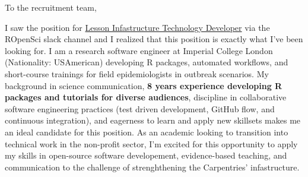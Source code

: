 




\vspace{1ex}
To the recruitment team,

\vspace{1ex}


I saw the position for
\href{https://static.carpentries.org/lesson-infrastructure-technology-developer/}{Lesson
Infastructure Technology Developer} via the ROpenSci slack channel and I
realized that this position is exactly what I've been looking for. I am a
research software engineer at Imperial College London (Nationality: USAmerican)
developing R packages, automated workflows, and short-course trainings for
field epidemiologists in outbreak scenarios. 
My background in science communication, \textbf{8 years experience developing R
packages and tutorials for diverse audiences}, discipline in collaborative
software engineering practices (test driven development, GitHub flow, and
continuous integration), and eagerness to learn and apply new skillsets makes
me an ideal candidate for this position. As an academic looking to transition into
technical work in the non-profit sector, I'm excited for this opportunity to
apply my skills in open-source software developement, evidence-based teaching,
and communication to the challenge of strenghthening the Carpentries'
infastructure. 

